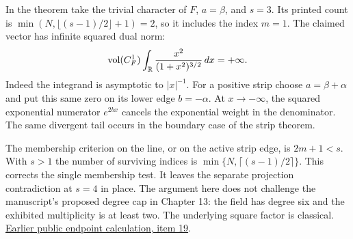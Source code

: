 \documentclass[11pt,reqno]{amsart}
\numberwithin{equation}{section}
\begin{document}
In the theorem take the trivial character of \(F\), \(a=\beta\), and \(s=3\). Its printed count is \(\min(N,\lfloor(s-1)/2\rfloor+1)=2\), so it includes the index \(m=1\). The claimed vector has infinite squared dual norm:
\[
   \operatorname{vol}(C_F^1)\int_{\mathbb R}\frac{x^2}{(1+x^2)^{3/2}}\,dx=+\infty .
\]
Indeed the integrand is asymptotic to \(|x|^{-1}\). For a positive strip choose \(a=\beta+\alpha\) and put this same zero on its lower edge \(b=-\alpha\). At \(x\to-\infty\), the squared exponential numerator \(e^{2bx}\) cancels the exponential weight in the denominator. The same divergent tail occurs in the boundary case of the strip theorem.

The membership criterion on the line, or on the active strip edge, is \(2m+1<s\). With \(s>1\) the number of surviving indices is \(\min\{N,\lceil(s-1)/2\rceil\}\). This corrects the single membership test. It leaves the separate projection contradiction at \(s=4\) in place. The argument here does not challenge the manuscript's proposed degree cap in Chapter 13: the field has degree six and the exhibited multiplicity is at least two. The underlying square factor is classical. \href{https://github.com/mccorvie/riemann-masullo/issues/2469\#issuecomment-7057757662}{Earlier public endpoint calculation, item 19}.
\end{document}
